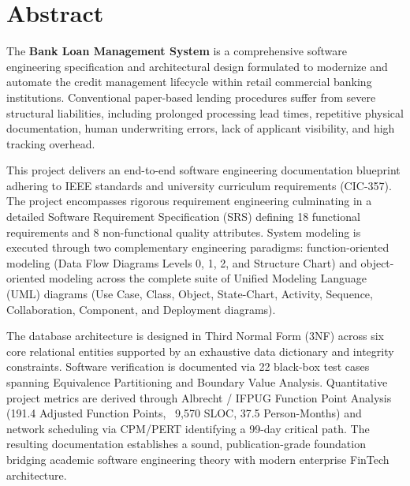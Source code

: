 \chapter*{Abstract}

The \textbf{Bank Loan Management System} is a comprehensive software engineering specification and architectural design formulated to modernize and automate the credit management lifecycle within retail commercial banking institutions. Conventional paper-based lending procedures suffer from severe structural liabilities, including prolonged processing lead times, repetitive physical documentation, human underwriting errors, lack of applicant visibility, and high tracking overhead.

This project delivers an end-to-end software engineering documentation blueprint adhering to IEEE standards and university curriculum requirements (CIC-357). The project encompasses rigorous requirement engineering culminating in a detailed Software Requirement Specification (SRS) defining 18 functional requirements and 8 non-functional quality attributes. System modeling is executed through two complementary engineering paradigms: function-oriented modeling (Data Flow Diagrams Levels 0, 1, 2, and Structure Chart) and object-oriented modeling across the complete suite of Unified Modeling Language (UML) diagrams (Use Case, Class, Object, State-Chart, Activity, Sequence, Collaboration, Component, and Deployment diagrams).

The database architecture is designed in Third Normal Form (3NF) across six core relational entities supported by an exhaustive data dictionary and integrity constraints. Software verification is documented via 22 black-box test cases spanning Equivalence Partitioning and Boundary Value Analysis. Quantitative project metrics are derived through Albrecht / IFPUG Function Point Analysis (191.4 Adjusted Function Points, ~9,570 SLOC, 37.5 Person-Months) and network scheduling via CPM/PERT identifying a 99-day critical path. The resulting documentation establishes a sound, publication-grade foundation bridging academic software engineering theory with modern enterprise FinTech architecture.
